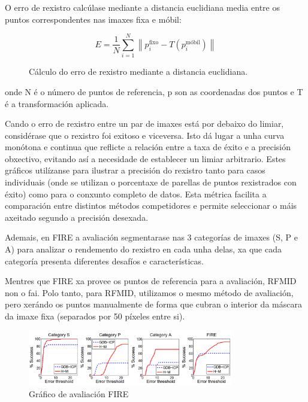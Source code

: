 O erro de rexistro calcúlase mediante a distancia euclidiana media entre os puntos correspondentes nas imaxes fixa e móbil:

\begin{figure}[tbp]
    \centering
    \[
    E = \frac{1}{N} \sum_{i=1}^{N} \left\| p_i^{\text{fixo}} - T(p_i^{\text{móbil}}) \right\|
    \]
    \caption{Cálculo do erro de rexistro mediante a distancia euclidiana.}
    \label{fig:erro_registro}
\end{figure}

onde N é o número de puntos de referencia, p son as coordenadas dos puntos e T é a transformación aplicada.

Cando o erro de rexistro entre un par de imaxes está por debaixo do limiar, considérase que o rexistro foi exitoso e viceversa. Isto dá lugar a unha curva monótona e continua que reflicte a relación entre a taxa de éxito e a precisión obxectivo, evitando así a necesidade de establecer un limiar arbitrario. 
Estes gráficos utilízanse para ilustrar a precisión do rexistro tanto para casos individuais (onde se utilizan o porcentaxe de parellas de puntos rexistrados con éxito)
como para o conxunto completo de datos.
Esta métrica facilita a comparación entre distintos métodos competidores e permite seleccionar o máis axeitado segundo a precisión desexada.
 
Ademais, en FIRE a avaliación segmentarase nas 3 categorías de imaxes (S, P e A) para analizar o rendemento do rexistro en cada unha delas, xa que cada categoría presenta diferentes desafíos e características.

 Mentres que FIRE xa provee os puntos de referencia para a avaliación, RFMID non o fai.
 Polo tanto, para RFMID, utilizamos o mesmo método de avaliación, pero xerándo os puntos manualmente de forma que cubran o interior da máscara da imaxe fixa (separados por 50 píxeles entre si).
 
 \begin{figure}[tbp]
    \centering
    \includegraphics[width=0.8\textwidth]{imaxes/fire_aval.png}
    \caption{Gráfico de avaliación FIRE \cite{FIRE}}
    \label{fig:fire_aval}
\end{figure}


